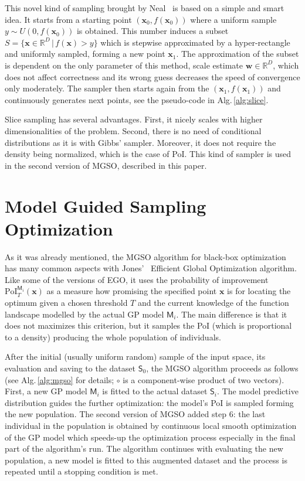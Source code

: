 \documentclass{itatnew}
\newcommand{\xx}{\mathrm{\mathbf{x}}}
\begin{document}
This novel kind of sampling brought by Neal~\cite{neal_slice_2003} is based on a simple and smart idea. It starts from a starting point $(\xx_0, f(\xx_0))$ where a uniform sample $y \sim U(0,f(\xx_0))$ is obtained. This number induces a subset $S=\{\xx \in \mathbb{R}^D \,|\, f(\xx) > y\}$ which is stepwise approximated by a hyper-rectangle and uniformly sampled, forming a new point $\xx_1$. The approximation of the subset is dependent on the only parameter of this method, scale estimate $\mathbf{w} \in \mathbb{R}^D$, which does not affect correctness and its wrong guess decreases the speed of convergence only moderately. The sampler then starts again from the $(\xx_1, f(\xx_1))$ and continuously generates next points, see the pseudo-code in Alg.\,\ref{alg:slice}.

Slice sampling has several advantages. First, it nicely scales with higher dimensionalities of the problem. Second, there is no need of conditional distributions as it is with Gibbs' sampler. Moreover, it does not require the density being normalized, which is the case of PoI. This kind of sampler is used in the second version of MGSO, described in this paper.


\section{Model Guided Sampling Optimization}
\label{sec:mgso}

As it was already mentioned, the MGSO algorithm for black-box optimization has many common aspects with Jones'~\cite{jones_efficient_1998} Efficient Global Optimization algorithm. Like some of the versions of EGO, it uses the probability of improvement $\mathrm{PoI}_T^{\mathsf{M}_i}(\xx)$ as a measure how promising the specified point $\xx$ is for locating the optimum given a chosen threshold $T$ and the current knowledge of the function landscape
modelled by the actual GP model $\mathsf{M}_i$. The main difference is that it does not maximizes this criterion, but it samples the PoI (which is proportional to a density) producing the whole population of individuals. 

After the initial (usually uniform random) sample of the input space, its evaluation and saving to the dataset $\mathsf{S}_0$, the MGSO algorithm proceeds as follows (see Alg.\,\ref{alg:mgso} for details; $\circ$ is a component-wise product of two vectors). First, a new GP model $\mathsf{M}_i$ is fitted to the actual dataset $\mathsf{S}_i$. The model predictive distribution guides the further optimization: the model's PoI is sampled forming the new population. The second version of MGSO added step 6: the last individual in the population is obtained by continuous local smooth optimization of the GP model which speeds-up the optimization process especially in the final part of the algorithm's run. The algorithm continues with evaluating the new population, a new model is fitted to this augmented dataset and the process is repeated until a stopping condition is met.
\end{document}
